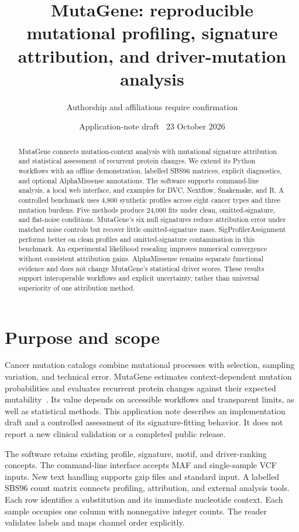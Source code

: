 \documentclass[11pt]{article}
\title{MutaGene: reproducible mutational profiling, signature attribution, and driver-mutation analysis}
\author{Authorship and affiliations require confirmation}
\date{Application-note draft \textbar\ 23 October 2026}
\begin{document}
\maketitle
\begin{abstract}
MutaGene connects mutation-context analysis with mutational signature attribution and statistical assessment of recurrent protein changes.
We extend its Python workflows with an offline demonstration, labelled SBS96 matrices, explicit diagnostics, and optional AlphaMissense annotations.
The software supports command-line analysis, a local web interface, and examples for DVC, Nextflow, Snakemake, and R.
A controlled benchmark uses 4,800 synthetic profiles across eight cancer types and three mutation burdens.
Five methods produce 24,000 fits under clean, omitted-signature, and flat-noise conditions.
MutaGene's six null signatures reduce attribution error under matched noise controls but recover little omitted-signature mass.
SigProfilerAssignment performs better on clean profiles and omitted-signature contamination in this benchmark.
An experimental likelihood rescaling improves numerical convergence without consistent attribution gains.
AlphaMissense remains separate functional evidence and does not change MutaGene's statistical driver scores.
These results support interoperable workflows and explicit uncertainty, rather than universal superiority of one attribution method.
\end{abstract}

\section{Purpose and scope}
Cancer mutation catalogs combine mutational processes with selection, sampling variation, and technical error.
MutaGene estimates context-dependent mutation probabilities and evaluates recurrent protein changes against their expected mutability~\cite{mutagene,ranking}.
Its value depends on accessible workflows and transparent limits, as well as statistical methods.
This application note describes an implementation draft and a controlled assessment of its signature-fitting behavior.
It does not report a new clinical validation or a completed public release.

The software retains existing profile, signature, motif, and driver-ranking concepts.
The command-line interface accepts MAF and single-sample VCF inputs.
New text handling supports gzip files and standard input.
A labelled SBS96 count matrix connects profiling, attribution, and external analysis tools.
Each row identifies a substitution and its immediate nucleotide context.
Each sample occupies one column with nonnegative integer counts.
The reader validates labels and maps channel order explicitly.
\end{document}
